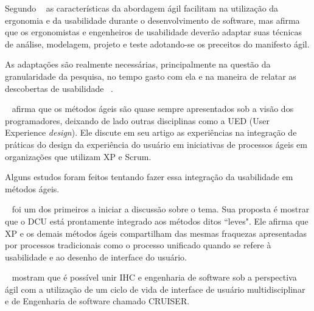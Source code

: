 	Segundo ~ as características da abordagem ágil facilitam na utilização da ergonomia e da usabilidade durante o desenvolvimento de software, mas afirma que os ergonomistas e engenheiros de usabilidade deverão adaptar suas técnicas de análise, modelagem, projeto e teste adotando-se os preceitos do manifesto ágil.
	
	As adaptações são realmente necessárias, principalmente na questão da granularidade da pesquisa, no tempo gasto com ela e na maneira de relatar as descobertas de usabilidade ~\cite{santos2012}.


	~ afirma que os métodos ágeis são quase sempre apresentados sob a visão dos programadores, deixando de lado outras disciplinas como a UED (User Experience \emph{design}). Ele discute em seu artigo as experiências na integração de práticas do design da experiência do usuário em iniciativas de processos ágeis em organizações que utilizam XP e Scrum. %

Alguns estudos foram feitos tentando fazer essa integração da usabilidade em métodos ágeis.

~ foi um dos primeiros a iniciar a discussão sobre o tema. Sua proposta é mostrar que o DCU está prontamente integrado aos métodos ditos ``leves". Ele afirma que XP e os demais métodos ágeis compartilham das mesmas fraquezas apresentadas por processos tradicionais como o processo unificado quando se refere à usabilidade e ao desenho de interface do usuário.


~ mostram que é possível unir IHC e engenharia de software sob a perspectiva ágil com a utilização de um ciclo de vida de interface de usuário multidisciplinar e de Engenharia de software chamado CRUISER.


